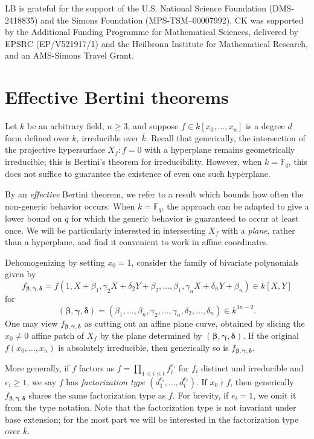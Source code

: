 \documentclass{amsart}
\newcommand{\F}{\mathbb{F}}
\renewcommand{\v}{\beta}
\newcommand{\w}{\gamma}
\newcommand{\z}{\delta}
\newcommand{\bv}{\boldsymbol{\v}}
\newcommand{\bw}{\boldsymbol{\w}}
\newcommand{\bz}{\boldsymbol{\z}}
\newcommand{\fvwz}{f_{\bv, \bw, \bz}}
\theoremstyle{definition}
\numberwithin{equation}{section}
\numberwithin{table}{section}
\begin{document}
LB is grateful for the support of the U.S. National Science Foundation (DMS-2418835) and the Simons Foundation (MPS-TSM–00007992). CK was supported by the Additional Funding Programme for Mathematical Sciences, delivered by EPSRC (EP/V521917/1) and the Heilbronn Institute for Mathematical Research, and an AMS-Simons Travel Grant.

\section{Effective Bertini theorems}
\label{sec:eff_bertini}

Let $k$ be an arbitrary field, $n \geq 3$, and suppose $f \in k[x_0,\ldots,x_n]$ is a degree $d$ form defined over $k$, irreducible over $\overline{k}$. Recall that generically, the intersection of the projective hypersurface $X_f \colon f = 0$ with a hyperplane remains geometrically irreducible; this is Bertini's theorem for irreducibility. However, when $k = \F_q$, this does not suffice to guarantee the existence of even one such hyperplane. 

By an \textit{effective} Bertini theorem, we refer to a result which bounds how often the non-generic behavior occurs. When $k = \F_q$, the approach can be adapted to give a lower bound on $q$ for which the generic behavior is guaranteed to occur at least once. We will be particularly interested in intersecting $X_f$ with a \textit{plane}, rather than a hyperplane, and find it convenient to work in affine coordinates.

Dehomogenizing by setting $x_0 = 1$, consider the family of bivariate polynomials given by
\[f_{\bv, \bw, \bz} = f(1, X + \v_1, \w_2X + \z_2 Y + \v_2, \ldots, \v_1, \w_n X + \z_n Y + \v_n) \in k[X,Y]\]
for
\[(\bv, \bw, \bz) = (\v_1, \ldots, \v_n, \w_2, \ldots, \w_n, \z_2, \ldots, \z_n) \in k^{3n-2}.\]
One may view $f_{\bv, \bw, \bz}$ as cutting out an affine plane curve, obtained by slicing the $x_0\neq 0$ affine patch of $X_f$ by the plane determined by $(\bv, \bw, \bz)$. If the original $f(x_0, \ldots, x_n)$ is absolutely irreducible, then generically so is $\fvwz$.

More generally, if $f$ factors as $f = \prod_{1 \leq i \leq t} f_i^{e_i}$ for $f_i$ distinct and irreducible and $e_i \geq 1$, we say $f$ has \textit{factorization type} $(d_1^{e_i},\ldots,d_t^{e_t})$. If $x_0 \nmid f$, then generically $\fvwz$ shares the same factorization type as $f$. For brevity, if $e_i = 1$, we omit it from the type notation. Note that the factorization type is not invariant under base extension; for the most part we will be interested in the factorization type over $\overline{k}$. 
\end{document}
